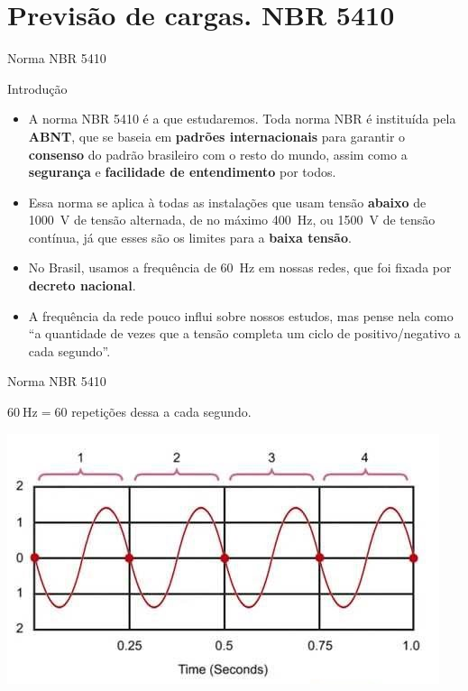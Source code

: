 \section{Previsão de cargas. NBR 5410}

\begin{frame}{Norma NBR 5410}
	\begin{block}{Introdução}
		\begin{itemize}
			\item A norma NBR 5410 é a que estudaremos. Toda norma NBR é instituída pela \textbf{ABNT}, que se baseia em \textbf{padrões internacionais} para garantir o \textbf{consenso} do padrão brasileiro com o resto do mundo, assim como a \textbf{segurança} e \textbf{facilidade de entendimento} por todos.
			\item Essa norma se aplica à todas as instalações que usam tensão \textbf{abaixo} de \SI{1000}{\volt} de tensão alternada, de no máximo \SI{400}{\hertz}, ou \SI{1500}{\volt} de tensão contínua, já que esses são os limites para a \textbf{baixa tensão}.
			\item No Brasil, usamos a frequência de \SI{60}{\hertz} em nossas redes, que foi fixada por \textbf{decreto nacional}.
			\item A frequência da rede pouco influi sobre nossos estudos, mas pense nela como ``a quantidade de vezes que a tensão completa um ciclo de positivo/negativo a cada segundo''.
		\end{itemize}
	\end{block}

\end{frame}


\begin{frame}{Norma NBR 5410}
	\begin{block}{}
		$ \SI{60}{\hertz}=60 $ repetições dessa a cada segundo.
	\end{block}

	\centering
	\includegraphics[width=0.7\linewidth]{Figuras/Ch02/fig1}

\end{frame}


